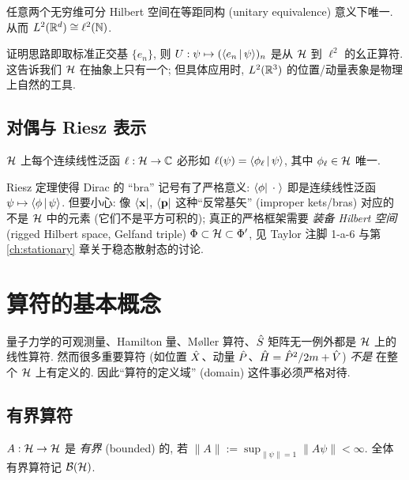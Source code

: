 \begin{theorem}\label{thm:hilbert-unique}
任意两个无穷维可分 Hilbert 空间在等距同构 (unitary equivalence) 意义下唯一. 从而 $L^2(\mathbb{R}^d)\cong\ell^2(\mathbb{N})$.
\end{theorem}

证明思路即取标准正交基 $\{e_n\}$, 则 $U:\psi\mapsto(\left\langle e_n \,\middle|\, \psi \right\rangle)_n$ 是从 $\mathcal{H}$ 到 $\ell^2$ 的幺正算符. 这告诉我们 $\mathcal{H}$ 在抽象上只有一个; 但具体应用时, $L^2(\mathbb{R}^3)$ 的位置/动量表象是物理上自然的工具.

\subsection{对偶与 Riesz 表示}

\begin{theorem}\label{thm:hilbert-riesz}
$\mathcal{H}$ 上每个连续线性泛函 $\ell:\mathcal{H}\to\mathbb{C}$ 必形如 $\ell(\psi)=\left\langle \phi_\ell \,\middle|\, \psi \right\rangle$, 其中 $\phi_\ell\in\mathcal{H}$ 唯一.
\end{theorem}

Riesz 定理使得 Dirac 的 ``bra'' 记号有了严格意义: $\bra\phi\;\cdot\;\rangle$ 即是连续线性泛函 $\psi\mapsto\left\langle \phi \,\middle|\, \psi \right\rangle$. 但要小心: 像 $\bra{\mathbf{x}}$, $\bra{\mathbf{p}}$ 这种``反常基矢'' (improper kets/bras) 对应的不是 $\mathcal{H}$ 中的元素 (它们不是平方可积的); 真正的严格框架需要 \emph{装备 Hilbert 空间} (rigged Hilbert space, Gelfand triple) $\Phi\subset\mathcal{H}\subset\Phi'$, 见 Taylor 注脚 1-a-6 与第 \ref{ch:stationary} 章关于稳态散射态的讨论.

\section{算符的基本概念}\label{sec:hilbert-operators}

量子力学的可观测量、Hamilton 量、Møller 算符、$\hat{S}$ 矩阵无一例外都是 $\mathcal{H}$ 上的线性算符. 然而很多重要算符 (如位置 $\hat{X}$、动量 $\hat{P}$、$\hat{H}=\hat{P}^2/2m+\hat{V}$) \emph{不是} 在整个 $\mathcal{H}$ 上有定义的. 因此``算符的定义域'' (domain) 这件事必须严格对待.

\subsection{有界算符}

\begin{definition}[有界算符]\label{def:hilbert-bdd}
$A:\mathcal{H}\to\mathcal{H}$ 是 \emph{有界} (bounded) 的, 若 $\|A\|:=\sup_{\|\psi\|=1}\|A\psi\|<\infty$. 全体有界算符记 $\mathcal{B}(\mathcal{H})$.
\end{definition}

